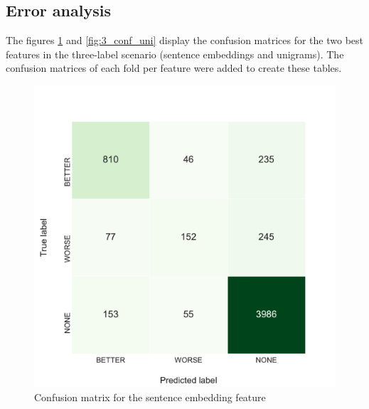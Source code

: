 \subsection{Error analysis}
The figures \ref{fig:3_conf_inf} and \ref{fig:3_conf_uni} display the confusion matrices for the two best features in the three-label scenario (sentence embeddings and unigrams). The confusion matrices of each fold per feature were added to create these tables.





\begin{figure}[h]
    \begin{minipage}{.5\linewidth}
   \caption{Confusion matrix for the sentence embedding feature} 
    \label{fig:3_conf_inf}
 \centering
	\includegraphics[width=1\linewidth]{images/experiments/conf-InferSent_False}
  \end{minipage} \hfill
    \begin{minipage}{.5\linewidth}
  

\end{minipage}
\end{figure}
